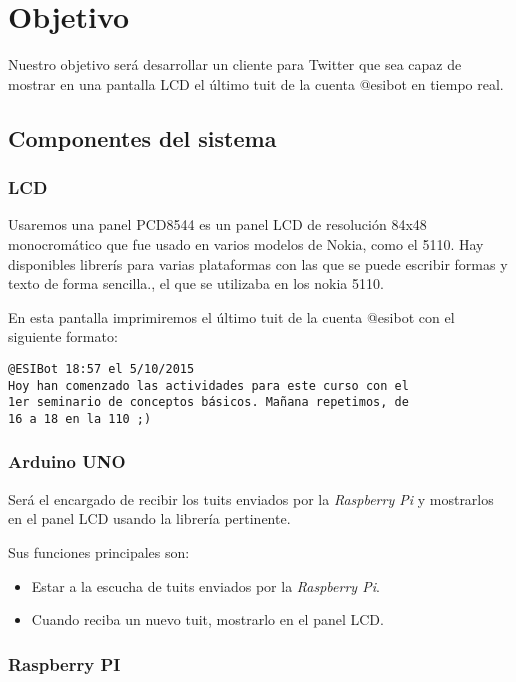 \section{Objetivo}\label{objetivo}

Nuestro objetivo será desarrollar un cliente para Twitter que sea capaz
de mostrar en una pantalla LCD el último tuit de la cuenta
@esibot en tiempo real.

\subsection{Componentes del sistema}\label{componentes-del-sistema}

\subsubsection{LCD}\label{lcd}

Usaremos una panel PCD8544 es un panel LCD de resolución 84x48 monocromático que fue usado en
  varios modelos de Nokia, como el 5110. Hay disponibles librerís para
  varias plataformas con las que se puede escribir formas y texto de
  forma sencilla., el que se utilizaba en los nokia 5110.

En esta pantalla imprimiremos el último tuit de la cuenta @esibot con el siguiente formato:

\begin{verbatim}
@ESIBot 18:57 el 5/10/2015
Hoy han comenzado las actividades para este curso con el
1er seminario de conceptos básicos. Mañana repetimos, de
16 a 18 en la 110 ;)
\end{verbatim}

\subsubsection{Arduino UNO}\label{arduino-uno}

Será el encargado de recibir los tuits enviados por la \emph{Raspberry
Pi} y mostrarlos en el panel LCD usando la librería pertinente.

Sus funciones principales son:

\begin{itemize}
\item
  Estar a la escucha de tuits enviados por la \emph{Raspberry Pi}.
\item
  Cuando reciba un nuevo tuit, mostrarlo en el panel LCD.
\end{itemize}

\subsubsection{Raspberry PI}\label{raspberry-pi}

